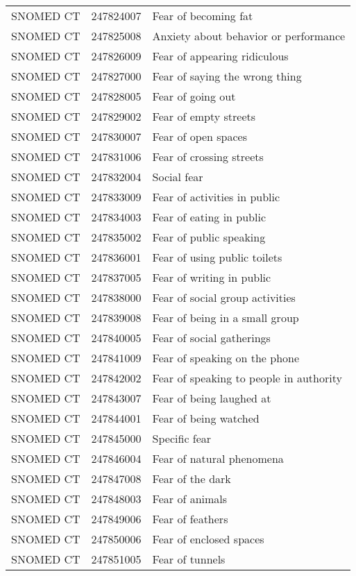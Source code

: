 \begin{longtable}{p{}p{}p{}}
  SNOMED CT & 247824007 & Fear of becoming fat \\ 
  SNOMED CT & 247825008 & Anxiety about behavior or performance \\ 
  SNOMED CT & 247826009 & Fear of appearing ridiculous \\ 
  SNOMED CT & 247827000 & Fear of saying the wrong thing \\ 
  SNOMED CT & 247828005 & Fear of going out \\ 
  SNOMED CT & 247829002 & Fear of empty streets \\ 
  SNOMED CT & 247830007 & Fear of open spaces \\ 
  SNOMED CT & 247831006 & Fear of crossing streets \\ 
  SNOMED CT & 247832004 & Social fear \\ 
  SNOMED CT & 247833009 & Fear of activities in public \\ 
  SNOMED CT & 247834003 & Fear of eating in public \\ 
  SNOMED CT & 247835002 & Fear of public speaking \\ 
  SNOMED CT & 247836001 & Fear of using public toilets \\ 
  SNOMED CT & 247837005 & Fear of writing in public \\ 
  SNOMED CT & 247838000 & Fear of social group activities \\ 
  SNOMED CT & 247839008 & Fear of being in a small group \\ 
  SNOMED CT & 247840005 & Fear of social gatherings \\ 
  SNOMED CT & 247841009 & Fear of speaking on the phone \\ 
  SNOMED CT & 247842002 & Fear of speaking to people in authority \\ 
  SNOMED CT & 247843007 & Fear of being laughed at \\ 
  SNOMED CT & 247844001 & Fear of being watched \\ 
  SNOMED CT & 247845000 & Specific fear \\ 
  SNOMED CT & 247846004 & Fear of natural phenomena \\ 
  SNOMED CT & 247847008 & Fear of the dark \\ 
  SNOMED CT & 247848003 & Fear of animals \\ 
  SNOMED CT & 247849006 & Fear of feathers \\ 
  SNOMED CT & 247850006 & Fear of enclosed spaces \\ 
  SNOMED CT & 247851005 & Fear of tunnels \\ 

\end{longtable}

